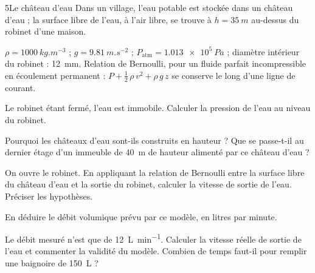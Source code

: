 \begin{exoBac}{5}{Le château d'eau}
Dans un village, l'eau potable est stockée dans un château d'eau ; la surface libre de l'eau, à l'air libre, se trouve à
$h=\qty{35}{m}$ au-dessus du robinet d'une maison.
\begin{donnees}
$\rho=\qty{1000}{kg.m^{-3}}$ ; $g=\qty{9,81}{m.s^{-2}}$ ; $P_\mathrm{atm}=\qty{1,013e5}{Pa}$ ; diamètre intérieur du robinet : \qty{12}{mm}.
Relation de Bernoulli, pour un fluide parfait incompressible en écoulement permanent : $P+\frac12\,\rho\,v^2+\rho\,g\,z$ se conserve le
long d'une ligne de courant.
\end{donnees}
\begin{questions}
\item Le robinet étant fermé, l'eau est immobile. Calculer la pression de l'eau au niveau du robinet.
\item Pourquoi les châteaux d'eau sont-ils construits en hauteur ? Que se passe-t-il au dernier étage d'un immeuble de
\qty{40}{m} de hauteur alimenté par ce château d'eau ?
\item On ouvre le robinet. En appliquant la relation de Bernoulli entre la surface libre du château d'eau et la sortie du
robinet, calculer la vitesse de sortie de l'eau. Préciser les hypothèses.
\item En déduire le débit volumique prévu par ce modèle, en litres par minute.
\item \initiative Le débit mesuré n'est que de \qty{12}{L.min^{-1}}. Calculer la vitesse réelle de sortie de l'eau et commenter la validité du
modèle. Combien de temps faut-il pour remplir une baignoire de \qty{150}{L} ?
\end{questions}
\end{exoBac}
